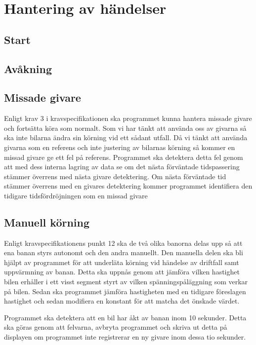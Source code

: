 \section{Hantering av händelser}


\subsection{Start}


\subsection{Avåkning}



\subsection{Missade givare}

Enligt krav 3 i kravspecifikationen ska programmet kunna hantera missade givare och fortsätta köra som normalt. Som vi har tänkt att använda oss av givarna så ska inte bilarna ändra sin körning vid ett sådant utfall. Då vi tänkt att använda givarna som en referens och inte justering av bilarnas körning så kommer en missad givare ge ett fel på referens. Programmet ska detektera detta fel genom att med dess interna lagring av data se om det nästa förväntade tidspassering stämmer överrens med nästa givare detektering. Om nästa förväntade tid stämmer överrens med en givares detektering kommer programmet identifiera den tidigare tidsfördröjningen som en missad givare


\subsection{Manuell körning}
Enligt kravspecifikationens punkt 12 ska de två olika banorna delas upp så att ena banan styrs autonomt och den andra manuellt. 
Den manuella delen ska bli hjälpt av programmet för att underläta körning vid händelse av driftfall samt uppvärmning av banan.
Detta ska uppnås genom att jämföra vilken hastighet bilen erhåller i ett visst segment styrt av vilken spänningspåläggning som verkar på bilen.
Sedan ska programmet  jämföra hastigheten med en tidigare föreslagen hastighet och sedan modifiera en konstant för att matcha det önskade värdet.

Programmet ska detektera att en bil har åkt av banan inom 10 sekunder. Detta ska göras genom att felvarna, avbryta programmet och skriva ut detta på displayen om programmet inte registrerar en ny givare inom dessa tio sekunder.
